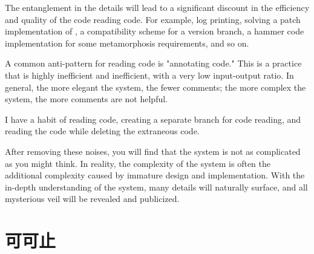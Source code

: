 \begin{content}

The entanglement in the details will lead to a significant discount in the efficiency and quality of the code reading code. For example, log printing, solving a patch implementation of , a compatibility scheme for a version branch, a hammer code implementation for some metamorphosis requirements, and so on.

A common anti-pattern for reading code is "annotating code." This is a practice that is highly inefficient and inefficient, with a very low input-output ratio. In general, the more elegant the system, the fewer comments; the more complex the system, the more comments are not helpful.

I have a habit of reading code, creating a separate  branch for code reading, and reading the code while deleting the extraneous code.

\begin{leftbar}
\end{leftbar}

After removing these noises, you will find that the system is not as complicated as you might think. In reality, the complexity of the system is often the additional complexity caused by immature design and implementation. With the in-depth understanding of the system, many details will naturally surface, and all mysterious veil will be revealed and publicized.

\end{content}

\section{可可止}

